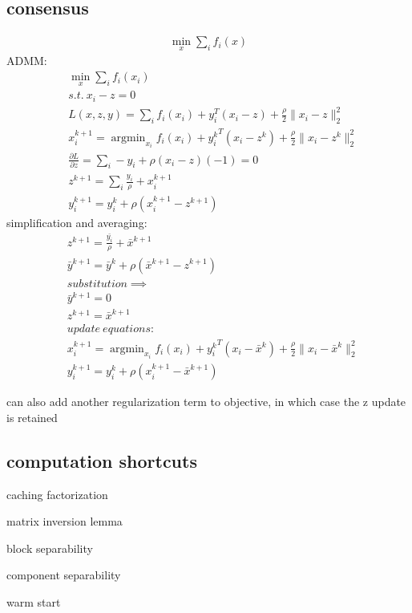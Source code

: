 \documentclass[8pt]{extarticle}
\DeclareMathOperator*{\argmin}{argmin}
\newcommand{\norm}[1]{\|#1\|}
\begin{document}
\begin{multicols*}{2}
  \subsection{consensus}
  \begin{align*}
    \min_x \sum_i f_i(x)
  \end{align*}
  ADMM:
  \begin{align*}
    &\min_x \sum_i f_i(x_i)\\
    &s.t.\ x_i-z=0\\
    &L(x,z,y) = \sum_i f_i(x_i)+y_i^T(x_i-z) + \frac{\rho}{2}\norm{x_i-z}_2^2\\
    &x_i^{k+1}=\argmin_{x_i} f_i(x_i)+{y_i^k}^T(x_i-z^k) + \frac{\rho}{2}\norm{x_i-z^k}_2^2\\
    &\frac{\partial L}{\partial z} = \sum_i -y_i + \rho (x_i-z)(-1)=0\\
    &z^{k+1} = \sum_i \frac{y_i}{\rho} + x_i^{k+1}\\
    &y_i^{k+1} = y_i^k + \rho(x_i^{k+1} - z^{k+1})
  \end{align*}
  simplification and averaging:
  \begin{align*}
    &z^{k+1} = \frac{\bar{y_i}}{\rho} + \bar{x}^{k+1}\\
    &\bar{y}^{k+1} = \bar{y}^k + \rho(\bar{x}^{k+1} - z^{k+1})\\
    &substitution \implies\\
    &\bar{y}^{k+1} = 0\\
    &z^{k+1} = \bar{x}^{k+1}\\
    &update\ equations:\\
    &x_i^{k+1}=\argmin_{x_i} f_i(x_i)+{y_i^k}^T(x_i-\bar{x}^k) + \frac{\rho}{2}\norm{x_i-\bar{x}^k}_2^2\\
    &y_i^{k+1} = y_i^k + \rho(x_i^{k+1} - \bar{x}^{k+1})
  \end{align*}  

  can also add another regularization term to objective, in which case the z update is retained
  
  \subsection{computation shortcuts}

  caching factorization

  matrix inversion lemma

  block separability

  component separability

  warm start


\end{multicols*}
\end{document}
